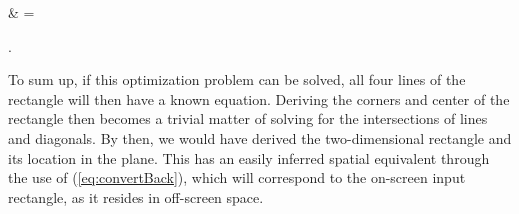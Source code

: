\begin{eqRef}\label{eq:AExpanded}
	& = 
\end{eqRef}
. 

To sum up, if this optimization problem can be solved, all four lines of the rectangle will then have a known equation. Deriving the corners and center  of the  rectangle then becomes a trivial matter of solving for the intersections of lines and diagonals. By then, we would have derived the two-dimensional rectangle and its location in the plane. This has an easily inferred spatial equivalent through the use of (\ref{eq:convertBack}), which will correspond to the on-screen input rectangle, as it resides in off-screen space. 

